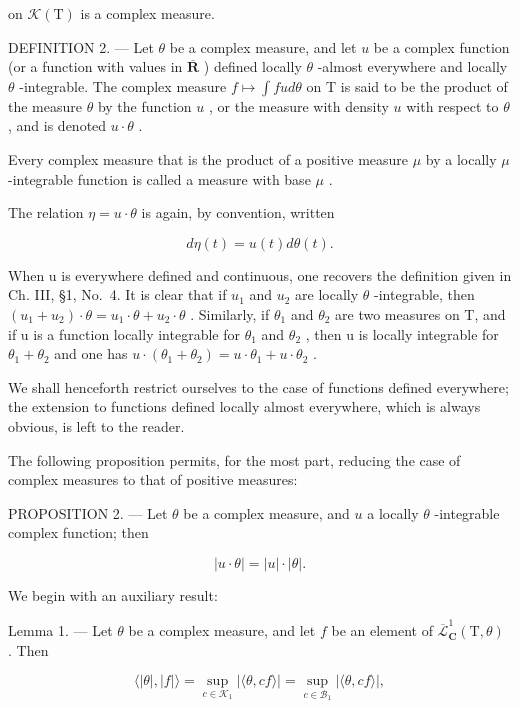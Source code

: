 on \(\mathcal{K}(\mathrm{T})\) is a complex measure.

DEFINITION 2. --- Let \(\theta\) be a complex measure, and let \(u\) be a complex function (or a function with values in \(\overline{\mathbf{R}}\) ) defined locally \(\theta\) -almost everywhere and locally \(\theta\) -integrable. The complex measure \(f \mapsto \int f u d\theta\) on T is said to be the product of the measure \(\theta\) by the function \(u\) , or the measure with density \(u\) with respect to \(\theta\) , and is denoted \(u \cdot \theta\) .

Every complex measure that is the product of a positive measure \(\mu\) by a locally \(\mu\) -integrable function is called a measure with base \(\mu\) .

The relation \(\eta = u \cdot \theta\) is again, by convention, written

\[
d \eta (t) = u (t) d \theta (t).
\]

When u is everywhere defined and continuous, one recovers the definition given in Ch. III, §1, No.~4. It is clear that if \(u_{1}\) and \(u_{2}\) are locally \(\theta\) -integrable, then \((u_{1}+u_{2})\cdot\theta=u_{1}\cdot\theta+u_{2}\cdot\theta\) . Similarly, if \(\theta_{1}\) and \(\theta_{2}\) are two measures on T, and if u is a function locally integrable for \(\theta_{1}\) and \(\theta_{2}\) , then u is locally integrable for \(\theta_{1}+\theta_{2}\) and one has \(u\cdot(\theta_{1}+\theta_{2})=u\cdot\theta_{1}+u\cdot\theta_{2}\) .

We shall henceforth restrict ourselves to the case of functions defined everywhere; the extension to functions defined locally almost everywhere, which is always obvious, is left to the reader.

The following proposition permits, for the most part, reducing the case of complex measures to that of positive measures:

PROPOSITION 2. --- Let \(\theta\) be a complex measure, and \(u\) a locally \(\theta\) -integrable complex function; then

\[
\left| u \cdot \theta \right| = \left| u \right| \cdot \left| \theta \right|.\tag{3}
\]

We begin with an auxiliary result:

Lemma 1. --- Let \(\theta\) be a complex measure, and let \(f\) be an element of \(\overline{\mathcal{L}}_{\mathbf{C}}^{1}(\mathrm{T},\theta)\) . Then

\[
\langle | \theta |, | f | \rangle = \sup _ {c \in \mathcal {K} _ {1}} | \langle \theta , c f \rangle | = \sup _ {c \in \mathcal {B} _ {1}} | \langle \theta , c f \rangle |,\tag{4}
\]

